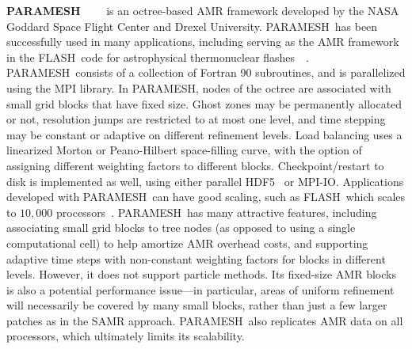 \documentclass[11pt,letterpaper]{article}
\newcommand{\paramesh}{\textsf{PARAMESH}}
\newcommand{\flash}{\textsf{FLASH}}
\begin{document}
\textbf{\paramesh}~\cite{MaOl00}~\cite{OlMa05}~\cite{Ol06}~\cite{wwwparamesh}
is an octree-based AMR framework developed by the NASA Goddard Space
Flight Center and Drexel University.  \paramesh\ has been successfully
used in many applications, including serving as the AMR framework in
the \flash\ code for astrophysical thermonuclear
flashes~\cite{FrOl00}~\cite{wwwflash}.  \paramesh\ consists of a
collection of Fortran 90 subroutines, and is parallelized using the
MPI library.
%
In \paramesh, nodes of the octree are associated with small grid
blocks that have fixed size.  Ghost zones may be permanently allocated
or not, resolution jumps are restricted to at most one level, and time
stepping may be constant or adaptive on different refinement levels.
Load balancing uses a linearized Morton or Peano-Hilbert space-filling
curve, with the option of assigning different weighting factors to
different blocks.  Checkpoint/restart to disk is implemented as well,
using either parallel HDF5~\cite{hdf5} or MPI-IO.  Applications
developed with \paramesh\ can have good scaling, such as \flash\ which
scales to $10,000$ processors~\cite{Du09}.
%
%
\paramesh\ has many attractive features, including associating small
grid blocks to tree nodes (as opposed to using a single computational
cell) to help amortize AMR overhead costs, and supporting adaptive
time steps with non-constant weighting factors for blocks in different
levels.  However, it does not support particle methods.  Its
fixed-size AMR blocks is also a potential performance issue---in
particular, areas of uniform refinement will necessarily be covered by
many small blocks, rather than just a few larger patches as in the
SAMR approach.  \paramesh\ also replicates AMR data on all processors, which
ultimately limits its scalability.

\end{document}
